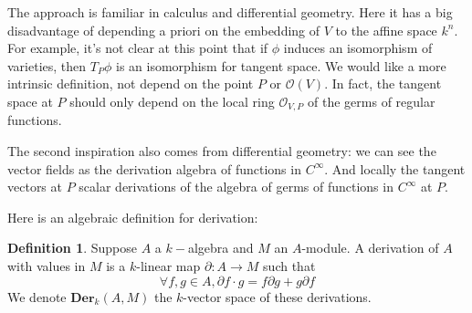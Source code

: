 \documentclass[12pt,a4paper,english]{article}
\theoremstyle{plain}
\theoremstyle{definition}
\newtheorem{defi}{Definition}
\theoremstyle{remark}
\newcommand{\der}{\textbf{Der}}
\begin{document}
The approach is familiar in calculus and differential geometry. Here it has a big disadvantage of depending a priori on the embedding of $V$ to the affine space $k^{n}$. For example, it's not clear at this point that if $\phi$ induces an isomorphism of varieties, then $T_{P}\phi$ is an isomorphism for tangent space. We would like a more intrinsic definition, not depend on the point $P$ or $\mathcal{O}(V)$. In fact, the tangent space at $P$ should only depend on the local ring $\mathcal{O}_{V, P}$ of the germs of regular functions. 

The second inspiration also comes from differential geometry: we can see the vector fields as the derivation algebra of functions in $C^{\infty}$. And locally the tangent vectors at $P$ scalar derivations of the algebra of germs
of functions in $C^{\infty}$ at $P$. 

Here is an algebraic definition for derivation:
\begin{defi}
Suppose $A$ a $k-$algebra and $M$ an $A$-module. A derivation of $A$ with values in $M$ is a $k$-linear map  $\partial: A\rightarrow M$ such that 
\begin{equation}\label{partialmulti}
    \forall f,g\in A,\partial f\cdot g=f\partial g+ g\partial f
\end{equation}
We denote $\der_{k}(A,M)$ the $k$-vector space of these derivations.
\end{defi}
\end{document}

